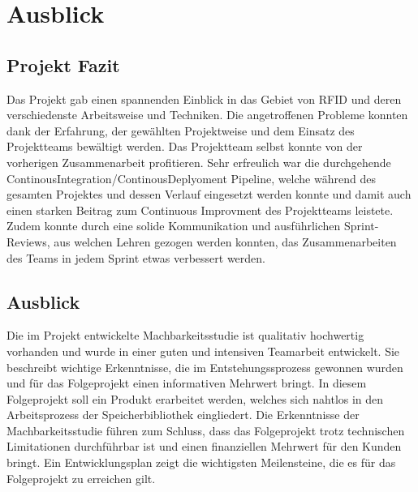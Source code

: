\chapter{Ausblick}
\label{ch:Ausblick}

\section{Projekt Fazit}
Das Projekt gab einen spannenden Einblick in das Gebiet von RFID und deren verschiedenste Arbeitsweise und Techniken. Die angetroffenen Probleme konnten dank der Erfahrung, der gewählten Projektweise und dem Einsatz des Projektteams bewältigt werden. Das Projektteam selbst konnte von der vorherigen Zusammenarbeit profitieren. Sehr erfreulich war die durchgehende ContinousIntegration/ContinousDeplyoment Pipeline, welche während des gesamten Projektes und dessen Verlauf eingesetzt werden konnte und damit auch einen starken Beitrag zum Continuous Improvment des Projektteams leistete. Zudem konnte durch eine solide Kommunikation und ausführlichen Sprint-Reviews, aus welchen Lehren gezogen werden konnten, das Zusammenarbeiten des Teams in jedem Sprint etwas verbessert werden.

\section{Ausblick}
Die im Projekt entwickelte Machbarkeitsstudie ist qualitativ hochwertig vorhanden und wurde in einer guten und intensiven Teamarbeit entwickelt. Sie beschreibt wichtige Erkenntnisse, die im Entstehungssprozess gewonnen wurden und für das Folgeprojekt einen informativen Mehrwert bringt. In diesem Folgeprojekt soll ein Produkt erarbeitet werden, welches sich nahtlos in den Arbeitsprozess der Speicherbibliothek eingliedert. Die Erkenntnisse der Machbarkeitsstudie führen zum Schluss, dass das Folgeprojekt trotz technischen Limitationen durchführbar ist und einen finanziellen Mehrwert für den Kunden bringt. Ein Entwicklungsplan zeigt die wichtigsten Meilensteine, die es für das Folgeprojekt zu erreichen gilt.

